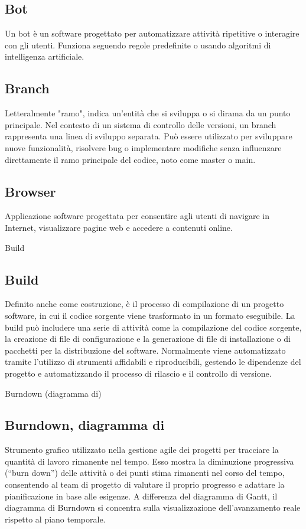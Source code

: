 \hypertarget{sec:Bot}{}
\subsection*{Bot}
Un bot è un software progettato per automatizzare attività ripetitive o interagire con gli utenti. 
Funziona seguendo regole predefinite o usando algoritmi di intelligenza artificiale.

\hypertarget{sec:branch}{}
\subsection*{Branch}
Letteralmente "ramo", indica un’entità che si sviluppa o si dirama da un punto principale. Nel contesto di un sistema di controllo delle versioni, 
un branch rappresenta una linea di sviluppo separata. Può essere utilizzato per sviluppare nuove funzionalità, risolvere bug o implementare modifiche 
senza influenzare direttamente il ramo principale del codice, noto come master o main.

\hypertarget{sec:browser}{}
\subsection*{Browser}
Applicazione software progettata per consentire agli utenti di navigare in Internet, visualizzare pagine web e accedere a contenuti online.

\hypertarget{sec:build}{Build}
\subsection*{Build}
Definito anche come costruzione, è il processo di compilazione di un progetto software, in cui il codice sorgente viene trasformato in un 
formato eseguibile. La build può includere una serie di attività come la compilazione del codice sorgente, la creazione di file di 
configurazione e la generazione di file di installazione o di pacchetti per la distribuzione del software. Normalmente viene automatizzato 
tramite l’utilizzo di strumenti affidabili e riproducibili, gestendo le dipendenze del progetto e automatizzando il processo di rilascio e 
il controllo di versione.

\hypertarget{sec:diagramma_di_burndown}{Burndown (diagramma di)}
\subsection*{Burndown, diagramma di}
Strumento grafico utilizzato nella gestione agile dei progetti per tracciare la quantità di lavoro rimanente nel tempo. 
Esso mostra la diminuzione progressiva (“burn down”) delle attività o dei punti stima rimanenti nel corso del tempo, 
consentendo al team di progetto di valutare il proprio progresso e adattare la pianificazione in base alle esigenze. 
A differenza del diagramma di Gantt, il diagramma di Burndown si concentra sulla visualizzazione dell’avanzamento reale rispetto al piano temporale.

